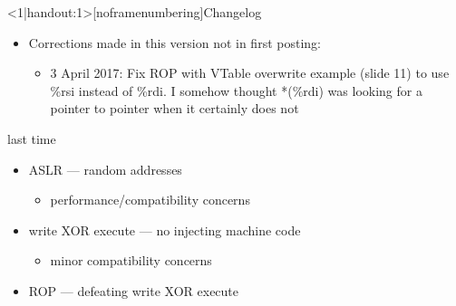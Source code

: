 \begin{frame}
    \titlepage
\end{frame}

{
\begin{frame}<1|handout:1>[noframenumbering]{Changelog}
    \begin{itemize}
        \item Corrections made in this version not in first posting:
        \begin{itemize}
            \item 3 April 2017: Fix ROP with VTable overwrite example (slide 11) to
            use \%rsi instead of \%rdi. I somehow thought *(\%rdi) was
            looking for a pointer to pointer when it certainly does not
        \end{itemize}
    \end{itemize}
\end{frame}
}


\begin{frame}{last time}
    \begin{itemize}
        \item ASLR --- random addresses
            \begin{itemize}
            \item performance/compatibility concerns
            \end{itemize}
        \item write XOR execute --- no injecting machine code
            \begin{itemize}
            \item minor compatibility concerns
            \end{itemize}
        \item ROP --- defeating write XOR execute
    \end{itemize}
\end{frame}

